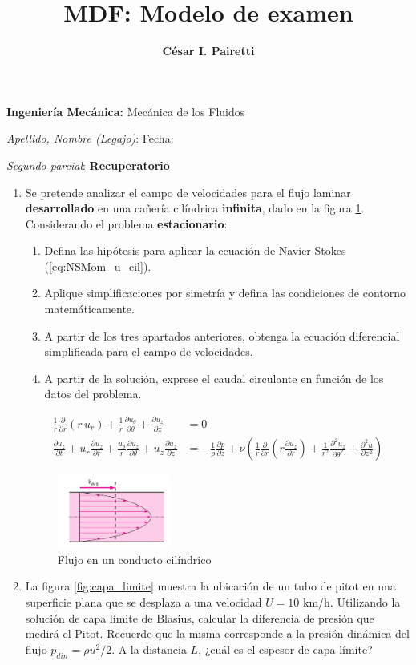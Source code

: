 \documentclass[a4paper,10pt]{article}
\title{MDF: Modelo de examen}
\author{{{\bf César I. Pairetti}}}
\newcommand{\MDF}
{
\begin{center}
{\Large {\bf Ingeniería Mecánica:} Mecánica de los Fluidos}
\end{center}
\textit{Apellido, Nombre (Legajo)}: \hskip 8.cm Fecha:
\vspace{0.2cm}
}
\begin{document}
\MDF
\noindent\underline{\textit{Segundo parcial}:} \textbf{Recuperatorio}
\begin{enumerate}
\item Se pretende analizar el campo de velocidades para el flujo laminar \textbf{desarrollado} en una cañería cilíndrica \textbf{infinita}, dado en la figura \ref{fig:hagen_poiseuille}. Considerando el problema \textbf{estacionario}:
\begin{enumerate}
  \item Defina las hipótesis para aplicar la ecuación de Navier-Stokes (\ref{eq:NSMom_u_cil}).
  \item Aplique simplificaciones por simetría y defina las condiciones de contorno matemáticamente.
  \item A partir de los tres apartados anteriores, obtenga la ecuación diferencial simplificada para el campo de velocidades.
  \item A partir de la solución, exprese el caudal circulante en función de los datos del problema.
\end{enumerate}

\begin{equation}\label{eq:NSMom_u_cil}
\begin{aligned}
\frac{1}{r}\frac{\partial }{\partial r} (r\,u_r)+ \frac{1}{r}\frac{\partial u_\theta}{\partial \theta} + \frac{\partial u_z}{\partial z}
&= 0 
\\
\frac{\partial u_z}{\partial t} + u_r\frac{\partial u_z}{\partial r} + \frac{u_\theta}{r}\frac{\partial u_z}{\partial \theta} + u_z \frac{\partial u_z}{\partial z}
&= -\frac{1}{\rho}\frac{\partial p}{\partial z}
+ \nu \left(\frac{1}{r}\frac{\partial}{\partial r}\left(r\frac{\partial u_z}{\partial r}\right) + \frac{1}{r^2}\frac{\partial^2 u_z}{\partial \theta^2} + \frac{\partial^2 u}{\partial z^2}\right)
\end{aligned}
\end{equation}
\begin{figure}[h!!]
\centering
\includegraphics[width=0.35\textwidth]{hagen_poiseuille.png}
\caption{Flujo en un conducto cilíndrico}
\label{fig:hagen_poiseuille}
\end{figure}
\item La figura \ref{fig:capa_limite} muestra la ubicación de un tubo de pitot en una superficie plana que se desplaza a una velocidad $U = 10$ km/h. Utilizando la solución de capa límite de Blasius, calcular la diferencia de presión que medirá el Pitot. Recuerde que la misma corresponde a la presión dinámica del flujo $p_{din} = \rho u^2/2$. A la distancia $L$, ¿cuál es el espesor de capa límite?


\end{enumerate}
\end{document}
